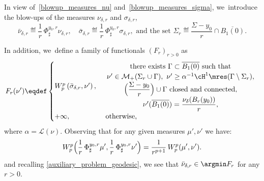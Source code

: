 In view of~\eqref{blowup_measures_nu} and~\eqref{blowup_measures_sigma}, we~introduce the blow-ups of the measures $\nu_{\delta ,r}$ and $\sigma_{\delta , r}$,
\begin{equation}\label{blowup_measures_renormalized}
\bar\nu_{\delta ,r}
\eqdef
\frac{1}{r}\,
\Phi^{y_0,r}_{\sharp}
\nu_{\delta ,r},
\quad
\bar\sigma_{\delta ,r}
\eqdef
\frac{1}{r}\,\Phi^{y_0,r}_{\sharp}
\sigma_{\delta , r},
\text{ and the set }
\Sigma_r \eqdef
\frac{\Sigma - y_0}{r}\cap \overline{B_1(0)}.
\end{equation}

In addition, we~define a family of functionals ${\left(F_r\right)}_{r > 0}$ as
\begin{equation}\label{family_Fr}
F_r(\nu') \eqdef
\begin{cases}
W_p^p\left(
\bar \sigma_{\delta ,r},
\nu'
\right),&
\begin{array}{c}
\text{there exists $\Gamma \subset \overline{B_1(0)}$ such that}\\
\nu' \in \mathcal{M}_+(\Sigma_r \cup \Gamma), \
\nu' \ge \alpha^{-1}\cH^1\mres(\Gamma\setminus \Sigma_r),\\
\Bigl(\dfrac{\Sigma-y_0}{r}\Bigr) \cup \Gamma \text{ closed and connected}, \\
\nu'(\overline{B_1(0)}) = \dfrac{\nu_\delta(B_r(y_0))}{r},
\end{array} \\
+\infty,& \text{ otherwise,}
\end{cases}
\end{equation}
where $\alpha = \mathcal{L}(\nu)$.
Observing that for any given measures $\mu', \nu'$ we have:
\begin{equation}\label{blowup_Wasserstein_identity}
W_p^p
\Bigl(
\frac{1}{r}\,\Phi^{y_0, r}_\sharp \mu',
\frac{1}{r}\,\Phi^{y_0, r}_\sharp \nu'
\Bigr)
=
\frac{1}{r^{p+1}}\,
W_p^p( \mu', \nu').
\end{equation}
and recalling
\eqref{auxiliary_problem_geodesic},
we see that $\bar \nu_{\delta ,r} \in \argmin F_r$ for any $r>0$.

